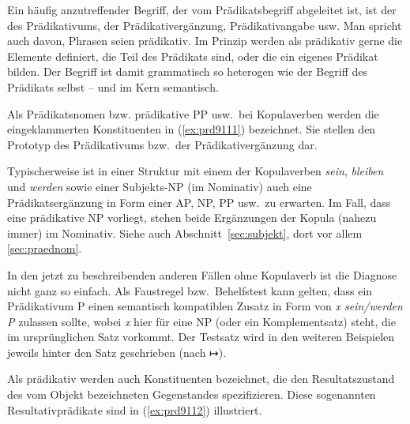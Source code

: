 Ein häufig anzutreffender Begriff, der vom Prädikatsbegriff abgeleitet ist, ist der des Prädikativums, der Prädikativergänzung, Prädikativangabe usw.
Man spricht auch davon, Phrasen seien prädikativ.
Im Prinzip werden als prädikativ gerne die Elemente definiert, die Teil des Prädikats sind, oder die ein eigenes Prädikat bilden.
Der Begriff ist damit grammatisch so heterogen wie der Begriff des Prädikats selbst -- und im Kern semantisch.


Als Prädikatsnomen bzw. prädikative PP usw.\ bei Kopulaverben werden die eingeklammerten Konstituenten in (\ref{ex:prd9111}) bezeichnet.
Sie stellen den Prototyp des Prädikativums bzw.\ der Prädikativergänzung dar.

\begin{exe}
  \ex\label{ex:prd9111} 
  \begin{xlist}
  \end{xlist}
\end{exe}

Typischerweise ist in einer Struktur mit einem der Kopulaverben \textit{sein}, \textit{bleiben} und \textit{werden} sowie einer Subjekts-NP (im Nominativ) auch eine Prädikatsergänzung in Form einer AP, NP, PP usw.\ zu erwarten.
Im Fall, dass eine prädikative NP vorliegt, stehen beide Ergänzungen der Kopula (nahezu immer) im Nominativ.
Siehe auch Abschnitt~\ref{sec:subjekt}, dort vor allem \ref{sec:praednom}.

In den jetzt zu beschreibenden anderen Fällen ohne Kopulaverb ist die Diagnose nicht ganz so einfach.
Als Faustregel bzw.\ Behelfstest kann gelten, dass ein Prädikativum P einen semantisch kompatiblen Zusatz in Form von \textit{x sein/werden P} zulassen sollte, wobei \textit{x} hier für eine NP (oder ein Komplementsatz) steht, die im ursprünglichen Satz vorkommt.
Der Testsatz wird in den weiteren Beispielen jeweils hinter den Satz geschrieben (nach ↦).

Als prädikativ werden auch Konstituenten bezeichnet, die den Resultatszustand des vom Objekt bezeichneten Gegenstandes spezifizieren.
Diese sogenannten Resultativprädikate sind in (\ref{ex:prd9112}) illustriert.

\begin{exe}
  \ex\label{ex:prd9112}
  \begin{xlist}
  \end{xlist}
\end{exe}

